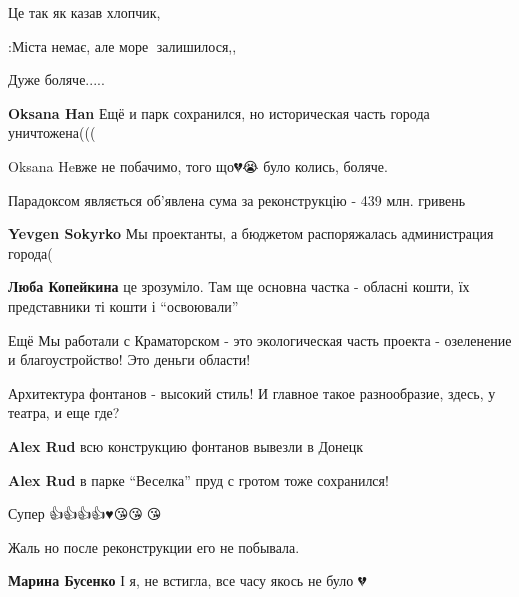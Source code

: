 
 
 
 
 

\qqSecCmt


Це так як казав хлопчик,

:Міста немає, але море 🌊залишилося,,

Дуже боляче.....

\begin{itemize} %
\textbf{Oksana Han} Ещё и парк сохранился, но историческая часть города уничтожена(((

Oksana Heвже не побачимо, того що💔😭 було колись, боляче.
\end{itemize} %


Парадоксом являється об'явлена сума за реконструкцію - 439 млн. гривень

\begin{itemize} %
\textbf{Yevgen Sokyrko} Мы проектанты, а бюджетом распоряжалась администрация города(

\textbf{Люба Копейкина} це зрозуміло. Там ще основна частка - обласні кошти, їх представники ті кошти і \enquote{освоювали}


Ещё Мы работали с Краматорском - это экологическая часть проекта - озеленение и
благоустройство! Это деньги области!
\end{itemize} %


Архитектура фонтанов - высокий стиль! И главное такое разнообразие, здесь, у
театра, и еще где?

\begin{itemize} %
\textbf{Alex Rud} всю конструкцию фонтанов вывезли в Донецк

\textbf{Alex Rud} в парке \enquote{Веселка} пруд с гротом тоже сохранился!
\end{itemize} %


Супер 👍👍👍👍♥️😘😘🥰😘


Жаль но после реконструкции его не побывала.

\textbf{Марина Бусенко} І я, не встигла, все часу якось не було 💔
